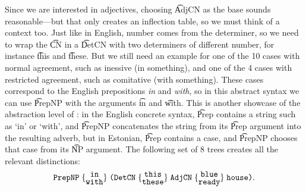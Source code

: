 

\noindent Since we are interested in adjectives, choosing \t{AdjCN} as
the base sounds reasonable---but that only creates an inflection
table, so we must think of a context too. Just like in English, number
comes from the determiner, so we need to wrap the \t{CN} in a \t{DetCN}
with two determiners of different number, for instance \t{this} and
\t{these}. But we still need an example for one of the 10 cases with
normal agreement, such as inessive (in something), and one of the 4
cases with restricted agreement, such as comitative (with something).
These cases correspond to the English prepositions \emph{in} and \emph{with},
so in this abstract syntax we can use \t{PrepNP} with the arguments
\t{in} and \t{with}. This is another showcase of the abstraction level
of \gf{}: in the English concrete syntax, \t{Prep} contains a string
such as `in' or `with', and \t{PrepNP} concatenates the string from its
\t{Prep} argument into the resulting adverb, but in Estonian, \t{Prep}
contains a case, and \t{PrepNP} chooses that case from its \t{NP} argument.
The following set of 8 trees creates all the relevant
distinctions:
\[
 \t{PrepNP} \; \{ \stackanchor{\tt in}{\tt with} \} \;
             \t{(DetCN} \; \{ \stackanchor{\tt this}{\tt these} \}
             \; 
             \t{AdjCN} \; \{\stackanchor{\tt blue}{\tt ready} \} 
             \; \t{house)}.
\]
